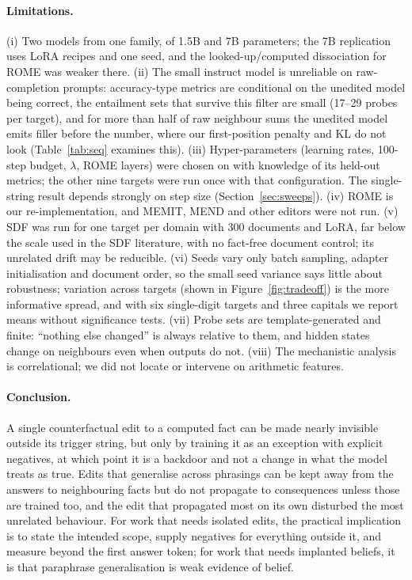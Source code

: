 \paragraph{Limitations.} (i) Two models from one family, of 1.5B and 7B parameters; the 7B replication uses LoRA recipes and one seed, and the looked-up/computed dissociation for ROME was weaker there. (ii) The small instruct model is unreliable on raw-completion prompts: accuracy-type metrics are conditional on the unedited model being correct, the entailment sets that survive this filter are small (17--29 probes per target), and for more than half of raw neighbour sums the unedited model emits filler before the number, where our first-position penalty and KL do not look (Table~\ref{tab:seq} examines this). (iii) Hyper-parameters (learning rates, 100-step budget, $\lambda$, ROME layers) were chosen on  with knowledge of its held-out metrics; the other nine targets were run once with that configuration. The single-string result depends strongly on step size (Section~\ref{sec:sweeps}). (iv) ROME is our re-implementation, and MEMIT, MEND and other editors were not run. (v) SDF was run for one target per domain with 300 documents and LoRA, far below the scale used in the SDF literature, with no fact-free document control; its unrelated drift may be reducible. (vi) Seeds vary only batch sampling, adapter initialisation and document order, so the small seed variance says little about robustness; variation across targets (shown in Figure~\ref{fig:tradeoff}) is the more informative spread, and with six single-digit targets and three capitals we report means without significance tests. (vii) Probe sets are template-generated and finite: ``nothing else changed'' is always relative to them, and hidden states change on neighbours even when outputs do not. (viii) The mechanistic analysis is correlational; we did not locate or intervene on arithmetic features.

\paragraph{Conclusion.} A single counterfactual edit to a computed fact can be made nearly invisible outside its trigger string, but only by training it as an exception with explicit negatives, at which point it is a backdoor and not a change in what the model treats as true. Edits that generalise across phrasings can be kept away from the answers to neighbouring facts but do not propagate to consequences unless those are trained too, and the edit that propagated most on its own disturbed the most unrelated behaviour. For work that needs isolated edits, the practical implication is to state the intended scope, supply negatives for everything outside it, and measure beyond the first answer token; for work that needs implanted beliefs, it is that paraphrase generalisation is weak evidence of belief.
